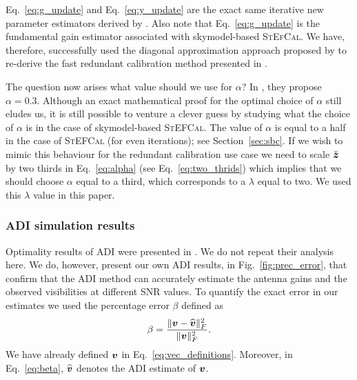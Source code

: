 \documentclass[useAMS,usenatbib]{mn2e}
\newcommand{\bz}{\bmath{z}}
\newcommand{\bv}{\bmath{v}}
\begin{document}
Eq.~\eqref{eq:g_update} and Eq.~\eqref{eq:y_update} are the exact same iterative new parameter estimators derived by \citet{Marthi2014}. Also note that Eq.~\eqref{eq:g_update} is the fundamental
gain estimator associated with skymodel-based \textsc{StEfCal}. We have, therefore, successfully used the diagonal approximation approach proposed by \citet{Smirnov2015} to re-derive the fast redundant calibration method presented in 
\citet{Marthi2014}. %

The question now arises what value should we use for $\alpha$? In \citet{Marthi2014}, they propose 
$\alpha = 0.3$. Although an exact mathematical proof for the optimal choice of $\alpha$ still eludes us, it is still possible to
venture a clever guess by studying what the choice of $\alpha$ is in the case of skymodel-based \textsc{StEFCal}. The value of $\alpha$ is equal to a half 
in the case of \textsc{StEFCal} (for even iterations); see Section~\ref{sec:sbc}. If we wish to mimic this behaviour for the redundant calibration use case we need to scale $\breve{\bz}$ by two thirds in Eq.~\eqref{eq:alpha} (see Eq.~\eqref{eq:two_thrids}) which implies that we should choose $\alpha$ equal to a third, which corresponds to a $\lambda$ equal to two.
We used this $\lambda$ value in this paper.

\subsubsection{ADI simulation results}
\label{sec:adi_results}
Optimality results of ADI were presented in \citet{Marthi2014}. We do not repeat their analysis here. We do, however, present our own ADI results, in Fig.~\ref{fig:prec_error}, that confirm that the
ADI method can accurately estimate the antenna gains and the observed visibilities at different SNR values. To quantify the exact error in our estimates we used the percentage error $\beta$ defined 
as 
\begin{equation}
\label{eq:beta}
\beta = \frac{\|\bv - \widehat{\bv}\|_F^2}{\|\bv\|_F^2}.
\end{equation}
We have already defined $\bv$ in Eq.~\eqref{eq:vec_definitions}. Moreover, in Eq.~\eqref{eq:beta}, $\widehat{\bv}$ denotes the ADI estimate of $\bv$.  
\end{document}
